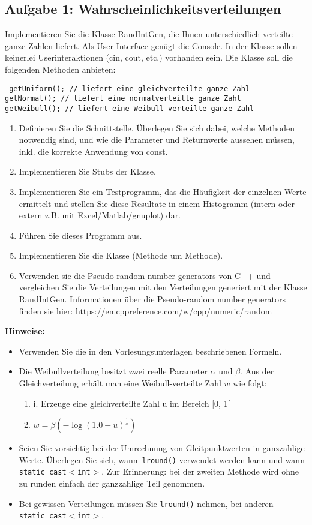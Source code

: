 \subsection{Aufgabe 1: Wahrscheinlichkeitsverteilungen}
Implementieren Sie die Klasse RandIntGen, die Ihnen unterschiedlich verteilte ganze Zahlen liefert. Als User
Interface genügt die Console. In der Klasse sollen keinerlei Userinteraktionen (cin, cout, etc.) vorhanden
sein. Die Klasse soll die folgenden Methoden anbieten:

\noindent
\texttt{
getUniform(); // liefert eine gleichverteilte ganze Zahl\\
getNormal(); // liefert eine normalverteilte ganze Zahl\\
getWeibull(); // liefert eine Weibull‐verteilte ganze Zahl}

\begin{enumerate}
  \item Definieren Sie die Schnittstelle. Überlegen Sie sich dabei, welche Methoden notwendig sind, und wie die
Parameter und Returnwerte aussehen müssen, inkl. die korrekte Anwendung von const.
\item Implementieren Sie Stubs der Klasse.
\item Implementieren Sie ein Testprogramm, das die Häufigkeit der einzelnen Werte ermittelt und stellen Sie
diese Resultate in einem Histogramm (intern oder extern z.B. mit Excel/Matlab/gnuplot) dar.
\item Führen Sie dieses Programm aus.
\item Implementieren Sie die Klasse (Methode um Methode).
\item Verwenden sie die Pseudo-random number generators von C++ und vergleichen Sie die Verteilungen
mit den Verteilungen generiert mit der Klasse RandIntGen. Informationen über die Pseudo-random
number generators finden sie hier: https://en.cppreference.com/w/cpp/numeric/random
\end{enumerate}

\textbf{Hinweise:}
\begin{itemize}
  \item  Verwenden Sie die in den Vorlesungsunterlagen beschriebenen Formeln.
  \item Die Weibullverteilung besitzt zwei reelle Parameter $\alpha$ und $\beta$. Aus der Gleichverteilung erhält man
eine Weibull-verteilte Zahl $w$ wie folgt:
\begin{enumerate}
  \item i. Erzeuge eine gleichverteilte Zahl u im Bereich [0, 1[
  \item $w = \beta(-\log(1.0-u)^{\frac{1}{a}})$
\end{enumerate}
\item  Seien Sie vorsichtig bei der Umrechnung von Gleitpunktwerten in ganzzahlige Werte. Überlegen Sie
sich, wann\texttt{ lround()} verwendet werden kann und wann \texttt{static\_cast$<$int$>$}. Zur Erinnerung: bei
der zweiten Methode wird ohne zu runden einfach der ganzzahlige Teil genommen.
\item Bei gewissen Verteilungen müssen Sie \texttt{lround()} nehmen, bei anderen \texttt{static\_cast$<$int$>$}.
\end{itemize}


